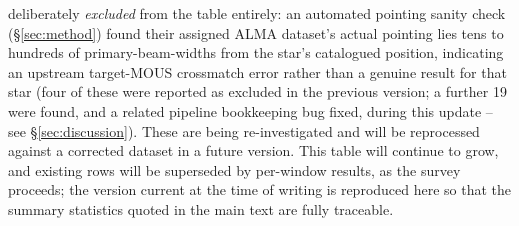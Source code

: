 \documentclass{openjournal}
\begin{document}
deliberately \emph{excluded} from the table entirely: an automated
pointing sanity check (\S\ref{sec:method}) found their assigned ALMA
dataset's actual pointing lies tens to hundreds of primary-beam-widths
from the star's catalogued position, indicating an upstream target-MOUS
crossmatch error rather than a genuine result for that star (four of
these were reported as excluded in the previous version; a further 19
were found, and a related pipeline bookkeeping bug fixed, during this
update -- see \S\ref{sec:discussion}). These are being re-investigated
and will be reprocessed against a corrected dataset in a future version.
This table will continue to grow, and existing rows will be superseded
by per-window results, as the survey proceeds; the version current at
the time of writing is reproduced here so that the summary statistics
quoted in the main text are fully traceable.
\end{document}
